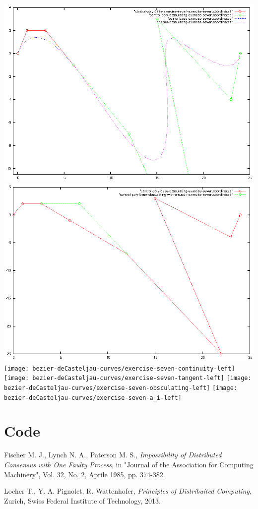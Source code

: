 \documentclass{article}
\begin{document}
\includegraphics{bezier-deCasteljau-curves/exercise-seven-obsculating}
\includegraphics{bezier-deCasteljau-curves/exercise-seven-a_succ_i}
\texttt{[image: bezier-deCasteljau-curves/exercise-seven-continuity-left]}
\texttt{[image: bezier-deCasteljau-curves/exercise-seven-tangent-left]}
\texttt{[image: bezier-deCasteljau-curves/exercise-seven-obsculating-left]}
\texttt{[image: bezier-deCasteljau-curves/exercise-seven-a\_i-left]}

\section{Code}


\newpage

\begin{thebibliography}{}

 Fischer M. J., Lynch N. A., Paterson M. S.,
  \emph{Impossibility of Distributed Consensus with One Faulty
    Process}, in "Journal of the Association for Computing Machinery",
  Vol. 32, No. 2, Aprile 1985, pp. 374-382.

 Locher T., Y. A. Pignolet, R. Wattenhofer,
  \textit{Principles of Distribuited Computing}, Zurich, Swiss Federal
  Institute of Technology, 2013.


\end{thebibliography}
\end{document}
